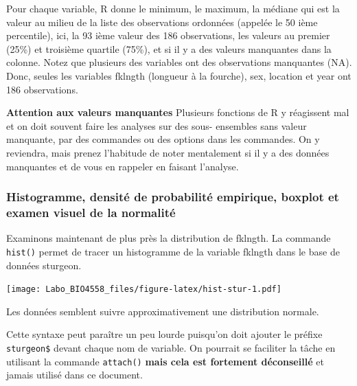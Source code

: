 \documentclass[12pt,]{book}
\makeatletter
\newenvironment{Shaded}{\begin{snugshade}}{\end{snugshade}}
\newcommand{\KeywordTok}[1]{\textcolor[rgb]{0.13,0.29,0.53}{\textbf{#1}}}
\newcommand{\NormalTok}[1]{#1}
\newcommand{\OperatorTok}[1]{\textcolor[rgb]{0.81,0.36,0.00}{\textbf{#1}}}
\newenvironment{kframe}{%
\medskip{}
\setlength{\fboxsep}{.8em}
\def\at@end@of@kframe{}%
\ifinner\ifhmode%
 \def\at@end@of@kframe{\end{minipage}}%
 \begin{minipage}{\columnwidth}%
\fi\fi%
\def\FrameCommand##1{\hskip\@totalleftmargin \hskip-\fboxsep
\colorbox{incolor}{##1}\hskip-\fboxsep
    \hskip-\linewidth \hskip-\@totalleftmargin \hskip\columnwidth}%
\MakeFramed {\advance\hsize-\width
  \@totalleftmargin\z@ \linewidth\hsize
  \@setminipage}}%
{\par\unskip\endMakeFramed%
\at@end@of@kframe}
\newenvironment{rmdblock}[1]
 {
 \begin{itemize}
 \renewcommand{\labelitemi}{
   \raisebox{-.7\height}[0pt][0pt]{
     {\setkeys{Gin}{width=3em,keepaspectratio}\texttt{[image: images/\#1]}}
   }
 }
 \begin{kframe}
 \setlength{\fboxsep}{1em}
 \item
 }
 {
 \end{kframe}
 \end{itemize}
 }
\newenvironment{rmdnote}
  {\begin{rmdblock}{note}}
  {\end{rmdblock}}
\newenvironment{rmdwarning}
  {\begin{rmdblock}{warning}}
  {\end{rmdblock}}
\makeatother
\begin{document}
Pour chaque variable, R donne le minimum, le maximum, la médiane qui est la valeur au milieu de la liste des observations ordonnées (appelée le 50 ième percentile), ici, la 93 ième valeur des 186 observations, les valeurs au premier (25\%) et troisième quartile (75\%), et si il y a des valeurs manquantes dans la colonne.
Notez que plusieurs des variables ont des observations manquantes (NA).
Donc, seules les variables fklngth (longueur à la fourche), sex, location et year ont 186 observations.

\begin{rmdwarning}
\textbf{Attention aux valeurs manquantes}
Plusieurs fonctions de R y réagissent mal et on doit souvent faire les analyses sur des sous- ensembles sans valeur manquante, par des commandes ou des options dans les commandes.
On y reviendra, mais prenez l'habitude de noter mentalement si il y a des données manquantes et de vous en rappeler en faisant l'analyse.
\end{rmdwarning}

\hypertarget{histogramme-densituxe9-de-probabilituxe9-empirique-boxplot-et-examen-visuel-de-la-normalituxe9}{%
\subsubsection{Histogramme, densité de probabilité empirique, boxplot et examen visuel de la normalité}\label{histogramme-densituxe9-de-probabilituxe9-empirique-boxplot-et-examen-visuel-de-la-normalituxe9}}

Examinons maintenant de plus près la distribution de fklngth.
La commande \texttt{hist()} permet de tracer un histogramme de la variable fklngth dans le base de données sturgeon.

\begin{Shaded}
\end{Shaded}

\texttt{[image: Labo\_BIO4558\_files/figure-latex/hist-stur-1.pdf]}

Les données semblent suivre approximativement une distribution normale.

\begin{rmdnote}
Cette syntaxe peut paraître un peu lourde puisqu'on doit ajouter le préfixe \texttt{sturgeon\$} devant chaque nom de variable.
On pourrait se faciliter la tâche en utilisant la commande \texttt{attach()} \textbf{mais cela est fortement déconseillé} et jamais utilisé dans ce document.
\end{rmdnote}
\end{document}
